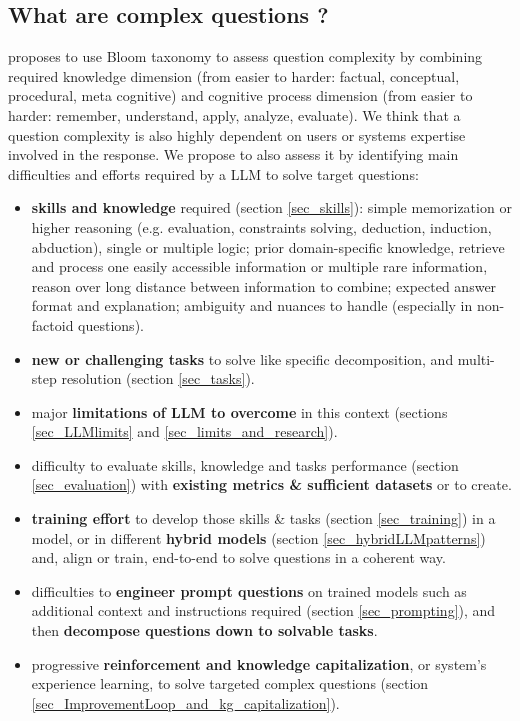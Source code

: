 \documentclass[acmsmall]{acmart}
\begin{document}
\subsection{What are complex questions ?}\label{CQA_definition}
\citet{ullrichUsingBloomTaxonomy2021} proposes to use Bloom taxonomy to assess question complexity by combining required knowledge dimension (from easier to harder: factual, conceptual, procedural, meta cognitive) and cognitive process dimension (from easier to harder: remember, understand, apply, analyze, evaluate). \newline
We think that a question complexity is also highly dependent on users or systems expertise involved in the response. We propose to also assess it by identifying main difficulties and efforts required by a LLM to solve target questions:
\begin{itemize}
    \item \textbf{skills and knowledge} required (section \ref{sec_skills}): simple memorization or higher reasoning (e.g. evaluation, constraints solving, deduction, induction, abduction), single or multiple logic; prior domain-specific knowledge, retrieve and process one easily accessible information or multiple rare information, reason over long distance between information to combine; expected answer format and explanation; ambiguity and nuances to handle (especially in non-factoid questions).
    \item \textbf{new or challenging tasks} to solve like specific decomposition, and multi-step resolution (section \ref{sec_tasks}).
    \item major \textbf{limitations of LLM to overcome} in this context (sections \ref{sec_LLMlimits} and \ref{sec_limits_and_research}).
    \item difficulty to evaluate skills, knowledge and tasks performance (section \ref{sec_evaluation}) with \textbf{existing metrics \& sufficient datasets} or to create.
    \item \textbf{training effort} to develop those skills \& tasks (section \ref{sec_training}) in a model, or in different \textbf{hybrid models} (section \ref{sec_hybridLLMpatterns}) and, align or train, end-to-end to solve questions in a coherent way.
    \item difficulties to \textbf{engineer prompt questions} on trained models such as additional context and instructions required (section \ref{sec_prompting}), and then \textbf{decompose questions down to solvable tasks}.
    \item progressive \textbf{reinforcement and knowledge capitalization}, or system's experience learning, to solve targeted complex questions (section \ref{sec_ImprovementLoop_and_kg_capitalization}).
\end{itemize}
\end{document}
